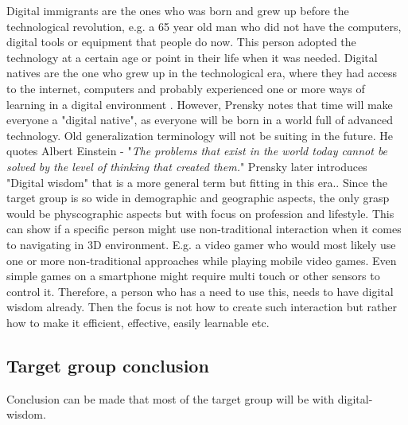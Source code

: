 Digital immigrants are the ones who was born and grew up before the technological revolution, e.g. a 65 year old man who did not have the computers, digital tools or equipment that people do now. This person adopted the technology at a certain age or point in their life when it was needed. 
Digital natives are the one who grew up in the technological era, where they had access to the internet, computers and probably experienced one or more ways of learning in a digital environment \cite{DigitalImmigrants}. However, Prensky notes that time will make everyone a "digital native", as everyone will be born in a world full of advanced technology. Old generalization terminology will not be suiting in the future. He quotes Albert Einstein - "\textit{The problems that exist in the world today cannot be solved by the level of thinking that created them.}" Prensky later introduces "Digital wisdom" that is a more general term but fitting in this era.\cite{DigitaIWisdom}. Since the target group is so wide in demographic and geographic aspects, the only grasp would be physcographic aspects but with focus on profession and lifestyle. This can show if a specific person might use non-traditional interaction when it comes to navigating in 3D environment. E.g. a video gamer who would most likely use one or more non-traditional approaches while playing mobile video games. Even simple games on a smartphone might require multi touch or other sensors to control it. 
Therefore, a person who has a need to use this, needs to have digital wisdom already. Then the focus is not how to create such interaction but rather how to make it efficient, effective, easily learnable etc. %

\subsection{Target group conclusion}
Conclusion can be made that most of the target group will be with digital-wisdom. 